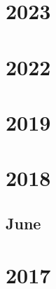\documentclass[12pt]{article}
\begin{document}



\section{2023}


\section{2022}

\section{2019}

\section{2018}
\subsection{June}
\begin{refsection}
    \nocite{radford_improving_nodate}
    \printbibliography[heading=none]
\end{refsection}


\section{2017}
\begin{refsection}
    \nocite{vaswani2023attentionneed}
    \printbibliography[heading=none]
\end{refsection}
\end{document}

